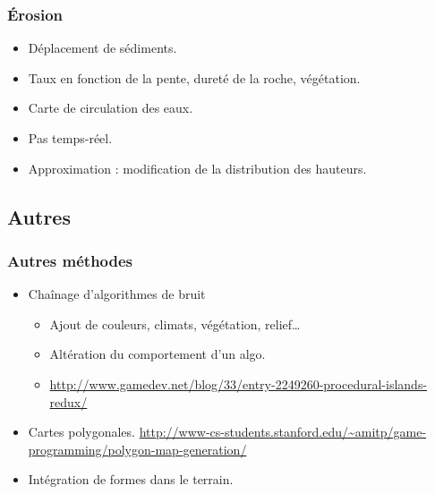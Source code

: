 \documentclass[hyperref={pdfpagelabels=false}]{beamer}
\begin{document}
\begin{frame}
  \frametitle{Érosion}
  \begin{itemize}
  \item Déplacement de sédiments.
  \item Taux en fonction de la pente, dureté de la roche, végétation.
  \item Carte de circulation des eaux.
  \item Pas temps-réel.
  \item Approximation : modification de la distribution des hauteurs.
    \begin{figure}[h]
      \centering
      \begin{tikzpicture}
      \end{tikzpicture}
    \end{figure}
  \end{itemize}
\end{frame}

\subsection{Autres}
\begin{frame}
  \frametitle{Autres méthodes}
  \begin{itemize}
  \item Chaînage d'algorithmes de bruit
    \begin{itemize}
    \item Ajout de couleurs, climats, végétation, relief\dots{}
    \item Altération du comportement d'un algo.
    \item {\tiny\url{http://www.gamedev.net/blog/33/entry-2249260-procedural-islands-redux/}}
    \end{itemize}
  \item Cartes polygonales. {\tiny\url{http://www-cs-students.stanford.edu/~amitp/game-programming/polygon-map-generation/}}
  \item Intégration de formes dans le terrain.
  \end{itemize}
\end{frame}
\end{document}
